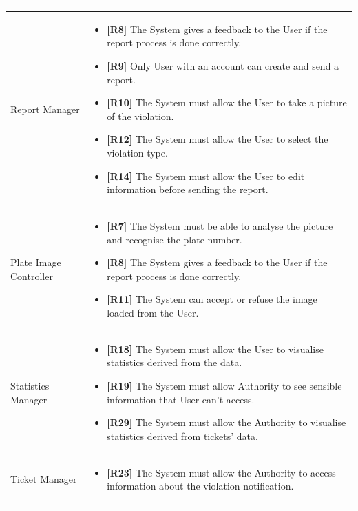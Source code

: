 \documentclass{article}
\begin{document}
\begin{longtable}{| p{5 cm} | p{8 cm} |}
\begin{itemize}
		\end{itemize}		\\	 \hline	
		\newline Report Manager  & 
		\begin{itemize}
			\item  {{\bf [R8]} The System gives a feedback to the User if the report process is done correctly.}
			\item  {{\bf [R9]} Only User with an account can create and send a report.}
			\item  {{\bf [R10]} The System must allow the User to take a picture of the violation.}
			\item  {{\bf [R12]} The System must allow the User to select the violation type.}
			\item  {{\bf[R14]} The System must allow the User to edit information before sending the report.}
		\end{itemize}		\\	 \hline	
		\newline Plate Image Controller & 
		\begin{itemize}
			\item  {{\bf[R7]} The System must be able to analyse the picture and recognise
the plate number.
}
			\item  {{\bf [R8]} The System gives a feedback to the User if the report process is done correctly.} 
			\item  {{\bf [R11]} The System can accept or refuse the image loaded from the User.}
		\end{itemize}		\\	 \hline	
		\newline Statistics Manager & 
		\begin{itemize}
			\item  {{\bf [R18]} The System must allow the User to visualise statistics derived from the data.}
			\item {{\bf [R19]}} The System must allow Authority to see sensible information that User can’t access. 
			\item  {{\bf [R29]} The System must allow the Authority to visualise statistics derived from tickets’ data.}
		\end{itemize}		\\	 \hline		
			\newline Ticket Manager & 
		\begin{itemize}
			\item  {{\bf [R23]} The System must allow the Authority to access information
about the violation notification.}

\end{itemize}
\end{longtable}
\end{document}
